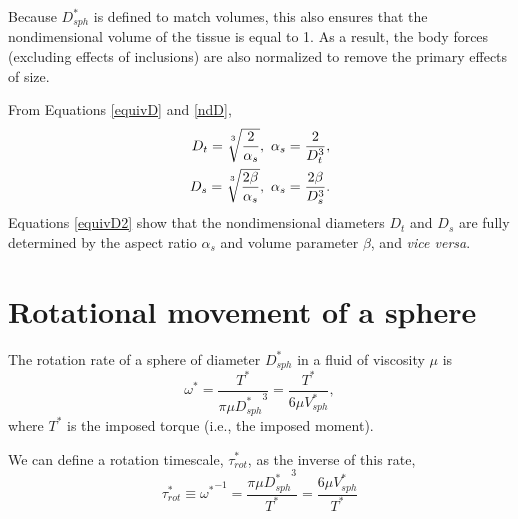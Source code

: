 \documentclass[10pt,a4paper]{article}
\def\non{\nonumber}
\begin{document}
Because $D_{sph}^*$ is defined to match volumes, this also ensures that the nondimensional volume of the tissue is equal to 1.
As a result, the body forces (excluding effects of inclusions) are also normalized to remove the primary effects of size.


From Equations \ref{equivD} and \ref{ndD},
\begin{eqnarray}\label{equivD2}
	D_t = \sqrt[\uproot{5}3]{\frac{2}{\alpha_s}}, ~ \alpha_s = \frac{2}{D_t^3}, \non \\
	D_s = \sqrt[\uproot{5}3]{\frac{2 \beta}{\alpha_s}}, ~ \alpha_s = \frac{2 \beta}{D_s^3}.
\end{eqnarray}
Equations \ref{equivD2} show that the nondimensional diameters $D_t$ and $D_s$ are fully determined by the aspect ratio $\alpha_s$ and volume parameter $\beta$, and \textit{vice versa}.


\section{Rotational movement of a sphere}\label{RotSect}
The rotation rate of a sphere of diameter $D_{sph}^*$ in a fluid of viscosity $\mu$ is 
\begin{equation}\label{rot1}
	\omega^* = \frac{T^*}{\pi \mu {D_{sph}^*}^3} = \frac{T^*}{6 \mu V_{sph}^*},	
\end{equation}
where $T^*$ is the imposed torque (i.e., the imposed moment).

We can define a rotation timescale, $\tau^*_{rot}$, as the inverse of this rate,
\begin{equation}\label{tau1}
	\tau^*_{rot} \equiv {\omega^*}^{-1} = \frac{\pi \mu {D_{sph}^*}^3}{T^*} = \frac{6 \mu V_{sph}^*}{T^*}
\end{equation}
\end{document}
